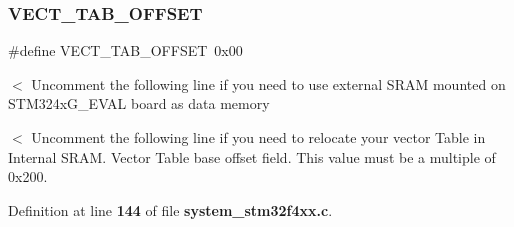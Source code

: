 \subsubsection{V\+E\+C\+T\+\_\+\+T\+A\+B\+\_\+\+O\+F\+F\+S\+ET}
{\footnotesize\ttfamily \#define V\+E\+C\+T\+\_\+\+T\+A\+B\+\_\+\+O\+F\+F\+S\+ET~0x00}

$<$ Uncomment the following line if you need to use external S\+R\+AM mounted on S\+T\+M324x\+G\+\_\+\+E\+V\+AL board as data memory

$<$ Uncomment the following line if you need to relocate your vector Table in Internal S\+R\+AM. Vector Table base offset field. This value must be a multiple of 0x200. 

Definition at line \textbf{ 144} of file \textbf{ system\+\_\+stm32f4xx.\+c}.

